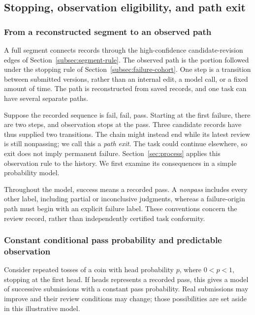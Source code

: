\subsection{Stopping, observation eligibility, and path exit}
\label{sec:process-theory}

\subsubsection{From a reconstructed segment to an observed path}
A full segment connects records through the high-confidence candidate-revision edges of Section~\ref{subsec:segment-rule}. The observed path is the portion followed under the stopping rule of Section~\ref{subsec:failure-cohort}. One step is a transition between submitted versions, rather than an internal edit, a model call, or a fixed amount of time. The path is reconstructed from saved records, and one task can have several separate paths.

Suppose the recorded sequence is fail, fail, pass. Starting at the first failure, there are two steps, and observation stops at the pass. Three candidate records have thus supplied two transitions. The chain might instead end while its latest review is still nonpassing; we call this a \emph{path exit}. The task could continue elsewhere, so exit does not imply permanent failure. Section~\ref{sec:process} applies this observation rule to the history. We first examine its consequences in a simple probability model.

Throughout the model, success means a recorded pass. A \emph{nonpass} includes every other label, including partial or inconclusive judgments, whereas a failure-origin path must begin with an explicit failure label. These conventions concern the review record, rather than independently certified task conformity.

\subsubsection{Constant conditional pass probability and predictable observation}
Consider repeated tosses of a coin with head probability $p$, where $0<p<1$, stopping at the first head. If heads represents a recorded pass, this gives a model of successive submissions with a constant pass probability. Real submissions may improve and their review conditions may change; those possibilities are set aside in this illustrative model.

